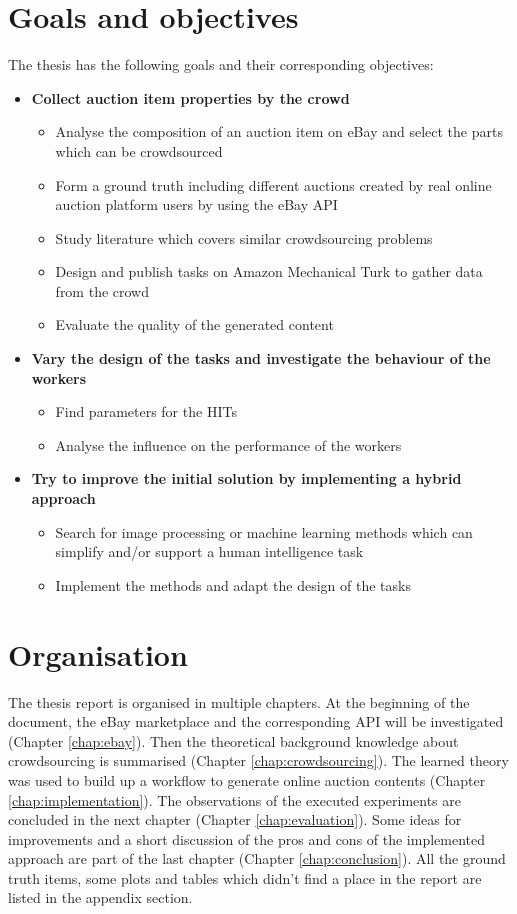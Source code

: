 \documentclass[a4paper]{report}
\begin{document}
\section{Goals and objectives}
The thesis has the following goals and their corresponding objectives:
\begin{itemize}
	\item \textbf{Collect auction item properties by the crowd}
	\begin{itemize}
		\item Analyse the composition of an auction item on eBay and select the parts which can be crowdsourced
		\item Form a ground truth including different auctions created by real online auction platform users by using the eBay API
		\item Study literature which covers similar crowdsourcing problems
		\item Design and publish tasks on Amazon Mechanical Turk to gather data from the crowd
		\item Evaluate the quality of the generated content
	\end{itemize}
	\item \textbf{Vary the design of the tasks and investigate the behaviour of the workers}
	\begin{itemize}
		\item Find parameters for the HITs
		\item Analyse the influence on the performance of the workers
	\end{itemize}
	\item \textbf{Try to improve the initial solution by implementing a hybrid approach}
	\begin{itemize}
		\item Search for image processing or machine learning methods which can simplify and/or support a human intelligence task
		\item Implement the methods and adapt the design of the tasks
	\end{itemize}
\end{itemize}

\section{Organisation}
The thesis report is organised in multiple chapters. At the beginning of the document, the eBay marketplace and the corresponding API will be investigated (Chapter \ref{chap:ebay}). Then the theoretical background knowledge about crowdsourcing is summarised (Chapter \ref{chap:crowdsourcing}). The learned theory was used to build up a workflow to generate online auction contents (Chapter \ref{chap:implementation}). The observations of the executed experiments are concluded in the next chapter (Chapter \ref{chap:evaluation}). Some ideas for improvements and a short discussion of the pros and cons of the implemented approach are part of the last chapter (Chapter \ref{chap:conclusion}). All the ground truth items, some plots and tables which didn't find a place in the report are listed in the appendix section.
\end{document}
